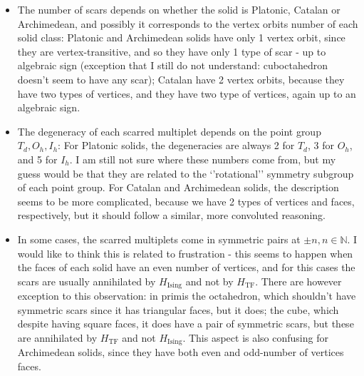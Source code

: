\documentclass[11pt,a4paper]{article}
\newcommand{\Hising}{H_{\mathrm{Ising}}}
\newcommand{\Htf}{H_{\mathrm{TF}}}
\begin{document}
\begin{itemize}
\item The number of scars depends on whether the solid is Platonic, Catalan or Archimedean, and possibly it corresponds to the vertex orbits number of each solid class: Platonic and Archimedean solids have only 1 vertex orbit, since they are vertex-transitive, and so they have only 1 type of scar - up to algebraic sign (exception that I still do not understand: cuboctahedron doesn't seem to have any scar); Catalan have 2 vertex orbits, because they have two types of vertices, and they have two type of vertices, again up to an algebraic sign.\\
\item The degeneracy of each scarred multiplet depends on the point group $T_d, O_h, I_h$: For Platonic solids, the degeneracies are always 2 for $T_d$, 3 for $O_h$, and 5 for $I_h$. I am still not sure where these numbers come from, but my guess would be that they are related to the `'rotational'' symmetry subgroup of each point group. For Catalan and Archimedean solids, the description seems to be more complicated, because we have 2 types of vertices and faces, respectively, but it should follow a similar, more convoluted reasoning.
\item In some cases, the scarred multiplets come in symmetric pairs at $\pm n, n\in\mathbb{N}$. I would like to think this is related to frustration - this seems to happen when the faces of each solid have an even number of vertices, and for this cases the scars are usually annihilated by $\Hising$ and not by $\Htf$. There are however exception to this observation: in primis the octahedron, which shouldn't have symmetric scars since it has triangular faces, but it does; the cube, which despite having square faces, it does have a pair of symmetric scars, but these are annihilated by $\Htf$ and not  $\Hising$. This aspect is also confusing for Archimedean solids, since they have both even and odd-number of vertices faces.
\end{itemize}
\end{document}
